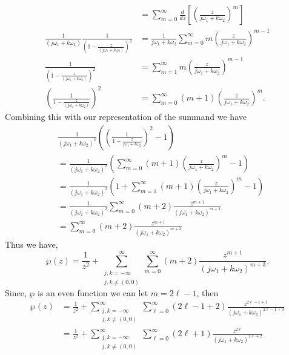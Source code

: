 \documentclass[10pt]{amsart}
\theoremstyle{nonumberplain}
\begin{document}
\begin{enumerate}[label={\bf {\arabic*}:}]
\begin{enumerate}
\begin{align*}
	&= \sum_{m=0}^{\infty} \frac d {dz} \left[ \left( \frac z {j \omega_1 + k \omega_2} \right)^m \right] \\
\frac 1 {(j \omega_1 + k \omega_2)} \frac {1} {\left(1 -  \frac z {(j \omega_1 + k \omega_2)} \right)^2}
	&= \frac 1 {j \omega_1 + k \omega_2} \sum_{m=0}^{\infty} m \left( \frac z {j \omega_1 + k \omega_2} \right)^{m - 1} \\
\frac {1} {\left(1 -  \frac z {(j \omega_1 + k \omega_2)} \right)^2}
	&= \sum_{m=1}^{\infty} m \left( \frac z {j \omega_1 + k \omega_2} \right)^{m - 1} \\
\left( \frac {1} {1 -  \frac z {(j \omega_1 + k \omega_2)} }\right)^2
	&= \sum_{m=0}^{\infty} (m + 1) \left( \frac z {j \omega_1 + k \omega_2} \right)^{m}.
\end{align*}
Combining this with our representation of the summand we have
\begin{align*}
&\frac{1}{\left(j \omega_1+k \omega_2\right)^2}
		\left( \left(  \frac 1 { 1 -  \frac z {j \omega_1 + k \omega_2} }\right)^2 - 1 \right) \\
	&= \frac{1}{\left(j \omega_1+k \omega_2\right)^2}
		\left( \sum_{m=0}^{\infty} (m + 1) \left( \frac z {j \omega_1 + k \omega_2} \right)^{m} - 1 \right) \\
	&= \frac{1}{\left(j \omega_1+k \omega_2\right)^2}
		\left( 1 + \sum_{m=1}^{\infty} (m + 1) \left( \frac z {j \omega_1 + k \omega_2} \right)^{m} - 1 \right) \\
	&= \frac{1}{\left(j \omega_1+k \omega_2\right)^2}
		\sum_{m=0}^{\infty} (m + 2) \frac {z^{m + 1}} {\left( j \omega_1 + k \omega_2\right)^{m + 1}} \\
	&= \sum_{m=0}^{\infty} (m + 2) \frac {z^{m + 1}} {\left( j \omega_1 + k \omega_2\right)^{m + 3}}
\end{align*}
Thus we have,
$$\wp(z) = \frac 1 {z^2} + \sum_{\substack{j, k=-\infty \\ j,k \neq (0,0)}}^{\infty} \sum_{m=0}^{\infty} (m + 2) \frac {z^{m + 1}} {\left( j \omega_1 + k \omega_2\right)^{m + 3}}.$$
Since, $\wp$ is an even function we can let $m = 2\ell - 1$, then
\begin{align*}
\wp(z) &= \frac 1 {z^2} + \sum_{\substack{j, k=-\infty \\ j,k \neq (0,0)}}^{\infty} \sum_{\ell=0}^{\infty} (2\ell - 1 + 2) \frac {z^{2\ell - 1 + 1}} {\left( j \omega_1 + k \omega_2\right)^{2\ell - 1 + 3}} \\
	&= \frac 1 {z^2} + \sum_{\substack{j, k=-\infty \\ j,k \neq (0,0)}}^{\infty} \sum_{\ell=0}^{\infty} (2\ell + 1) \frac {z^{2\ell}} {\left( j \omega_1 + k \omega_2\right)^{2\ell + 2}}

\end{align*}
\end{enumerate}
\end{enumerate}
\end{document}
